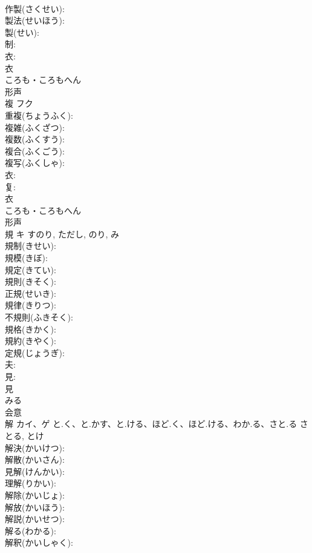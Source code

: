 \documentclass[8pt]{extreport}
\begin{document}
\begin{CJK}{UTF8}{min}
\\	作製(さくせい): 
\\	製法(せいほう): 
\\	製(せい): 
\\	制: 
\\	衣: 
\\	衣	
\\	ころも・ころもへん	
\\	形声 
\\	複	フク			
\\	重複(ちょうふく): 
\\	複雑(ふくざつ): 
\\	複数(ふくすう): 
\\	複合(ふくごう): 
\\	複写(ふくしゃ): 
\\	衣: 
\\	复: 
\\	衣	
\\	ころも・ころもへん	
\\	形声 
\\	規	キ		すのり, ただし, のり, み	
\\	規制(きせい): 
\\	規模(きぼ): 
\\	規定(きてい): 
\\	規則(きそく): 
\\	正規(せいき): 
\\	規律(きりつ): 
\\	不規則(ふきそく): 
\\	規格(きかく): 
\\	規約(きやく): 
\\	定規(じょうぎ): 
\\	夫: 
\\	見: 
\\	見	
\\	みる	
\\	会意 
\\	解	カイ、ゲ	と.く、と.かす、と.ける、ほど.く、ほど.ける、わか.る、さと.る	さとる, とけ	
\\	解決(かいけつ): 
\\	解散(かいさん): 
\\	見解(けんかい): 
\\	理解(りかい): 
\\	解除(かいじょ): 
\\	解放(かいほう): 
\\	解説(かいせつ): 
\\	解る(わかる): 
\\	解釈(かいしゃく): 

\end{CJK}
\end{document}
